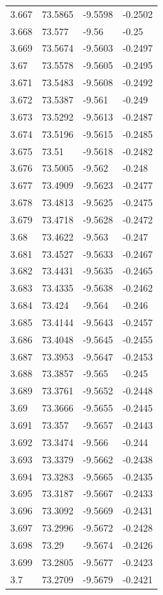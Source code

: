\begin{tabular}{llll}
3.667 & 73.5865 & -9.5598 & -0.2502 \\
3.668 & 73.577 & -9.56 & -0.25 \\
3.669 & 73.5674 & -9.5603 & -0.2497 \\
3.67 & 73.5578 & -9.5605 & -0.2495 \\
3.671 & 73.5483 & -9.5608 & -0.2492 \\
3.672 & 73.5387 & -9.561 & -0.249 \\
3.673 & 73.5292 & -9.5613 & -0.2487 \\
3.674 & 73.5196 & -9.5615 & -0.2485 \\
3.675 & 73.51 & -9.5618 & -0.2482 \\
3.676 & 73.5005 & -9.562 & -0.248 \\
3.677 & 73.4909 & -9.5623 & -0.2477 \\
3.678 & 73.4813 & -9.5625 & -0.2475 \\
3.679 & 73.4718 & -9.5628 & -0.2472 \\
3.68 & 73.4622 & -9.563 & -0.247 \\
3.681 & 73.4527 & -9.5633 & -0.2467 \\
3.682 & 73.4431 & -9.5635 & -0.2465 \\
3.683 & 73.4335 & -9.5638 & -0.2462 \\
3.684 & 73.424 & -9.564 & -0.246 \\
3.685 & 73.4144 & -9.5643 & -0.2457 \\
3.686 & 73.4048 & -9.5645 & -0.2455 \\
3.687 & 73.3953 & -9.5647 & -0.2453 \\
3.688 & 73.3857 & -9.565 & -0.245 \\
3.689 & 73.3761 & -9.5652 & -0.2448 \\
3.69 & 73.3666 & -9.5655 & -0.2445 \\
3.691 & 73.357 & -9.5657 & -0.2443 \\
3.692 & 73.3474 & -9.566 & -0.244 \\
3.693 & 73.3379 & -9.5662 & -0.2438 \\
3.694 & 73.3283 & -9.5665 & -0.2435 \\
3.695 & 73.3187 & -9.5667 & -0.2433 \\
3.696 & 73.3092 & -9.5669 & -0.2431 \\
3.697 & 73.2996 & -9.5672 & -0.2428 \\
3.698 & 73.29 & -9.5674 & -0.2426 \\
3.699 & 73.2805 & -9.5677 & -0.2423 \\
3.7 & 73.2709 & -9.5679 & -0.2421 \\

\end{tabular}
